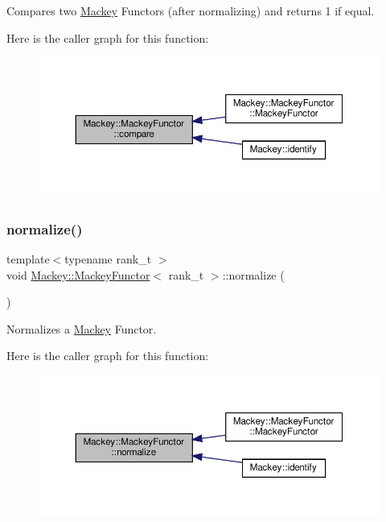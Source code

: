 Compares two \hyperlink{namespaceMackey}{Mackey} Functors (after normalizing) and returns 1 if equal. 

Here is the caller graph for this function\+:\nopagebreak
\begin{figure}[H]
\begin{center}
\leavevmode
\includegraphics[width=350pt]{classMackey_1_1MackeyFunctor_a334a91a445ac86cc5cce53b29efd6df1_icgraph}
\end{center}
\end{figure}
\mbox{\label{classMackey_1_1MackeyFunctor_ae63fdf151f6ee653d6cb50d442948e30}} 
\subsubsection{\texorpdfstring{normalize()}{normalize()}}
{\footnotesize\ttfamily template$<$typename rank\+\_\+t $>$ \\
void \hyperlink{classMackey_1_1MackeyFunctor}{Mackey\+::\+Mackey\+Functor}$<$ rank\+\_\+t $>$\+::normalize (\begin{DoxyParamCaption}{ }\end{DoxyParamCaption})}



Normalizes a \hyperlink{namespaceMackey}{Mackey} Functor. 

Here is the caller graph for this function\+:\nopagebreak
\begin{figure}[H]
\begin{center}
\leavevmode
\includegraphics[width=350pt]{classMackey_1_1MackeyFunctor_ae63fdf151f6ee653d6cb50d442948e30_icgraph}
\end{center}
\end{figure}
\mbox{\label{classMackey_1_1MackeyFunctor_a44d3104a47f23de5d8141b7800db6d11}} 
